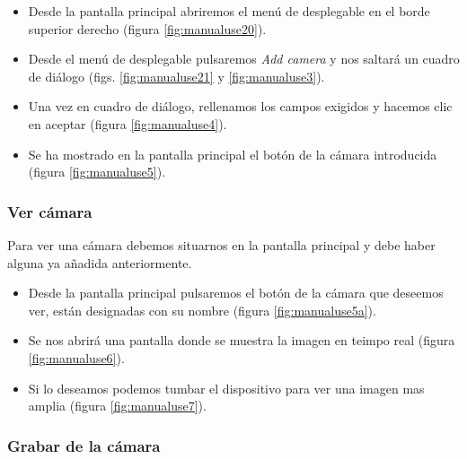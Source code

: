 \begin{itemize}
\item
	Desde la pantalla principal abriremos el menú de desplegable en el borde superior derecho (figura \ref{fig:manualuse20}).
\item
	Desde el menú de desplegable pulsaremos \textit{Add camera} y nos saltará un cuadro de diálogo (figs. \ref{fig:manualuse21} y \ref{fig:manualuse3}).
\item
	Una vez en cuadro de diálogo, rellenamos los campos exigidos y hacemos clic en aceptar (figura \ref{fig:manualuse4}).
\item
	Se ha mostrado en la pantalla principal el botón de la cámara introducida (figura \ref{fig:manualuse5}).
\end{itemize}

\subsubsection{Ver cámara}

Para ver una cámara debemos situarnos en la pantalla principal y debe haber alguna ya añadida anteriormente.

\begin{itemize}
\item
	Desde la pantalla principal pulsaremos el botón de la cámara que deseemos ver, están designadas con su nombre (figura \ref{fig:manualuse5a}).
\item
	Se nos abrirá una pantalla donde se muestra la imagen en teimpo real (figura \ref{fig:manualuse6}).
\item
	Si lo deseamos podemos tumbar el dispositivo para ver una imagen mas amplia (figura \ref{fig:manualuse7}).
\end{itemize}

\subsubsection{Grabar de la cámara}

